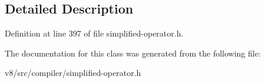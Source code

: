 \subsection{Detailed Description}


Definition at line 397 of file simplified-\/operator.\+h.



The documentation for this class was generated from the following file\+:\begin{DoxyCompactItemize}
\item 
v8/src/compiler/simplified-\/operator.\+h\end{DoxyCompactItemize}
